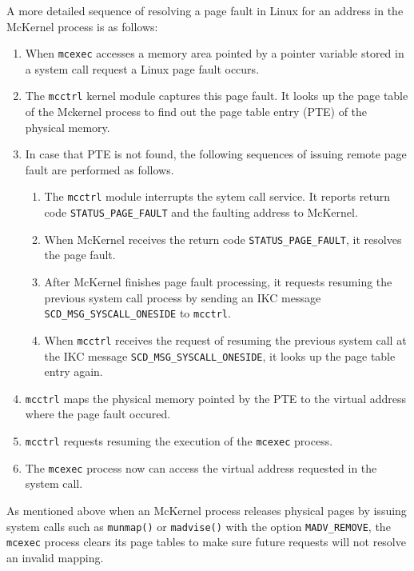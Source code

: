 \documentclass[twoside,11pt,fleqn]{book}
\begin{document}
A more detailed sequence of resolving a page fault in Linux for an address
in the McKernel process is as follows:

\begin{enumerate}
\item When \texttt{mcexec} accesses a memory area pointed by
a pointer variable stored in a system call request a Linux
page fault occurs.

\item The \texttt{mcctrl} kernel module captures this page fault.
It looks up the page table of the Mckernel process to find out the page
table entry (PTE) of the physical memory.

\item In case that PTE is not found, the following sequences of issuing
remote page fault are performed as follows.
\begin{enumerate}
\item The \texttt{mcctrl} module interrupts the sytem call service.
It reports return code \texttt{STATUS\_PAGE\_FAULT} and the faulting
address to McKernel.

\item When McKernel receives the return code \texttt{STATUS\_PAGE\_FAULT},
it resolves the page fault.

\item After McKernel finishes page fault processing,
it requests resuming the previous system call process by sending an IKC message
\texttt{SCD\_MSG\_SYSCALL\_ONESIDE} to \texttt{mcctrl}.

\item When \texttt{mcctrl} receives the request of resuming the previous
system call at the IKC message \texttt{SCD\_MSG\_SYSCALL\_ONESIDE},
it looks up the page table entry again.
\end{enumerate}

\item \texttt{mcctrl} maps the physical memory pointed by the PTE
to the virtual address where the page fault occured.

\item \texttt{mcctrl} requests resuming the execution of the \texttt{mcexec}
process.

\item The {\tt mcexec} process now can access the virtual address
requested in the system call.
\end{enumerate}

As mentioned above when an McKernel process releases physical pages by
issuing system calls such as \texttt{munmap()} or \texttt{madvise()} with
the option \texttt{MADV\_REMOVE}, the \texttt{mcexec} process clears
its page tables to make sure future requests will not resolve an
invalid mapping.
\end{document}
